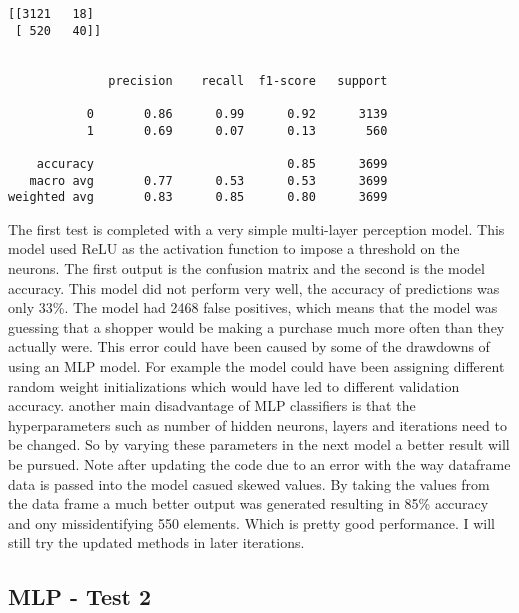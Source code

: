 \documentclass[11pt]{article}
\begin{document}
    \begin{Verbatim}[commandchars=\\\{\}]
[[3121   18]
 [ 520   40]]


              precision    recall  f1-score   support

           0       0.86      0.99      0.92      3139
           1       0.69      0.07      0.13       560

    accuracy                           0.85      3699
   macro avg       0.77      0.53      0.53      3699
weighted avg       0.83      0.85      0.80      3699

    \end{Verbatim}

    The first test is completed with a very simple multi-layer perception
model. This model used ReLU as the activation function to impose a
threshold on the neurons. The first output is the confusion matrix and
the second is the model accuracy. This model did not perform very well,
the accuracy of predictions was only 33\%. The model had 2468 false
positives, which means that the model was guessing that a shopper would
be making a purchase much more often than they actually were. This error
could have been caused by some of the drawdowns of using an MLP model.
For example the model could have been assigning different random weight
initializations which would have led to different validation accuracy.
another main disadvantage of MLP classifiers is that the hyperparameters
such as number of hidden neurons, layers and iterations need to be
changed. So by varying these parameters in the next model a better
result will be pursued. Note after updating the code due to an error
with the way dataframe data is passed into the model casued skewed
values. By taking the values from the data frame a much better output
was generated resulting in 85\% accuracy and ony missidentifying 550
elements. Which is pretty good performance. I will still try the updated
methods in later iterations.

    \hypertarget{mlp---test-2}{%
\subsection{MLP - Test 2}\label{mlp---test-2}}
\end{document}
